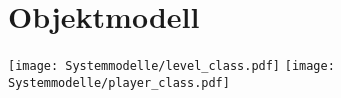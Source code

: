 \section{Objektmodell}
\clearpage
\texttt{[image: Systemmodelle/level\_class.pdf]}
\clearpage
\texttt{[image: Systemmodelle/player\_class.pdf]}
